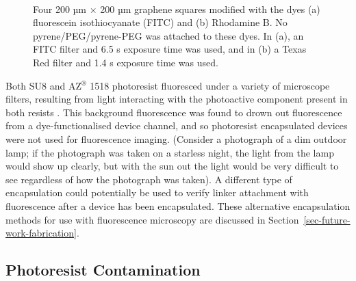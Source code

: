 \documentclass[
  a4paper,
]{scrbook}
\begin{document}
\begin{figure}
\begin{minipage}[t]{0.45\linewidth}
{{}

}

\end{minipage}%
%
\begin{minipage}[t]{0.01\linewidth}

{\centering 

~

}

\end{minipage}%

\caption[Four 200 µm \(\times\) 200 µm graphene squares modified with
the dyes fluorescein isothiocyanate (FITC) and Rhodamine
B.]{\label{fig-FITC-rhodamine-B}Four 200 µm \(\times\) 200 µm graphene
squares modified with the dyes (a) fluorescein isothiocyanate (FITC) and
(b) Rhodamine B. No pyrene/PEG/pyrene-PEG was attached to these dyes. In
(a), an FITC filter and 6.5 s exposure time was used, and in (b) a Texas
Red filter and 1.4 s exposure time was used.}

\end{figure}

Both SU8 and AZ\(^\circledR\) 1518 photoresist fluoresced under a
variety of microscope filters, resulting from light interacting with the
photoactive component present in both resists \autocite{Pai2007}. This
background fluorescence was found to drown out fluorescence from a
dye-functionalised device channel, and so photoresist encapsulated
devices were not used for fluorescence imaging. (Consider a photograph
of a dim outdoor lamp; if the photograph was taken on a starless night,
the light from the lamp would show up clearly, but with the sun out the
light would be very difficult to see regardless of how the photograph
was taken). A different type of encapsulation could potentially be used
to verify linker attachment with fluorescence after a device has been
encapsulated. These alternative encapsulation methods for use with
fluorescence microscopy are discussed in
Section~\ref{sec-future-work-fabrication}.

\hypertarget{sec-photoresist-contamination}{%
\subsection{Photoresist
Contamination}\label{sec-photoresist-contamination}}
\end{document}
